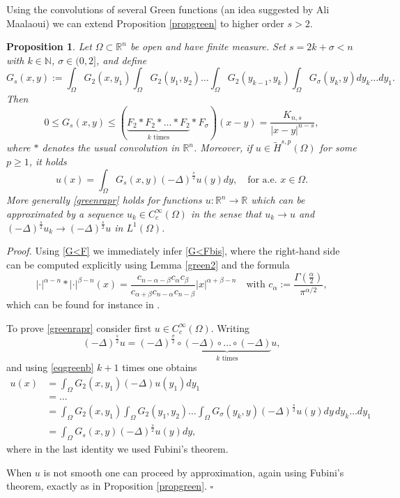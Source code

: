 \documentclass[11pt, a4paper]{article}
\newtheorem{prop}[trm]{Proposition}
\newcommand{\R}{\mathbb{R}}
\newenvironment{proof}{\noindent\emph{Proof.}}{\phantom{ } \hfill$\square$\medskip}
\begin{document}
Using the convolutions of several Green functions (an idea suggested by Ali Maalaoui) we can extend Proposition \ref{propgreen} to higher order $s>2$.

\begin{prop}\label{propgreen2} Let $\Omega\subset\R^n$ be open and have finite measure. Set $s=2k+\sigma<n$ with $k\in\mathbb{N}$, $\sigma\in (0,2]$, and define
$$G_s(x,y):=\int_\Omega G_2(x,y_1)\int_\Omega G_2(y_1,y_2)\dots\int_\Omega G_2(y_{k-1},y_k)\int_\Omega G_\sigma(y_k,y) dy_k\dots dy_1.$$
Then
\begin{equation}\label{G<Fbis}
0\le G_s(x,y)\le (\underbrace{F_2 * F_2*\dots *F_2}_{k\text{ times}}*F_\sigma) (x-y)= \frac{K_{n,s}}{|x-y|^{n-s}},
\end{equation}
where $*$ denotes the usual convolution in $\R^n$.
Moreover, if $u\in \tilde H^{s,p}(\Omega)$ for some $p\ge1$, it holds
\begin{equation}\label{greenrapr}
u(x)=\int_\Omega G_s(x,y)(-\Delta)^\frac{s}{2} u(y)dy, \quad \text{for a.e. }x\in\Omega.
\end{equation}
More generally \eqref{greenrapr} holds for functions $u:\R^n\to\R$ which can be approximated by a sequence $u_k\in C^\infty_c(\Omega)$ in the sense that $u_k\to u$ and $(-\Delta)^\frac{s}{2}u_k \to (-\Delta)^\frac{s}{2}u$ in $L^1(\Omega)$.
\end{prop}

\begin{proof}
Using \eqref{G<F} we immediately infer \eqref{G<Fbis}, where the right-hand side can be computed explicitly using Lemma \ref{green2} %
and the formula
$$|\cdot|^{\alpha-n}*|\cdot|^{\beta-n}(x)=\frac{c_{n-\alpha-\beta}c_\alpha c_\beta}{c_{\alpha+\beta}c_{n-\alpha}c_{n-\beta}}|x|^{\alpha+\beta-n}\quad \text{with }c_\alpha:=\frac{\Gamma(\frac \alpha 2)}{\pi^{\alpha/2}},$$
which can be found for instance in \cite[page 134]{LL}.

To prove \eqref{greenrapr} consider first $u\in C^\infty_c(\Omega)$. Writing
$$(-\Delta)^\frac{s}{2} u=(-\Delta)^\frac{\sigma}{2}\circ \underbrace{(-\Delta)\circ \dots\circ(-\Delta)}_{k\textrm{ times}} u,$$
and using \eqref{eqgreenb} $k+1$ times one obtains
\[
\begin{split}
u(x)&=\int_\Omega G_2(x,y_1)(-\Delta)u(y_1)dy_1\\
&=\dots\\
&=\int_\Omega G_2(x,y_1)\int_\Omega G_2(y_1,y_2)\dots\int_\Omega G_\sigma(y_k,y) (-\Delta)^\frac{s}{2} u(y) dy\,dy_k\dots dy_1\\
&=\int_\Omega G_s(x,y)(-\Delta)^\frac{s}{2} u(y)dy,
\end{split}
\]
where in the last identity we used Fubini's theorem.

When $u$ is not smooth one can proceed by approximation, again using Fubini's theorem, exactly as in Proposition \ref{propgreen}.
\end{proof}
\end{document}

